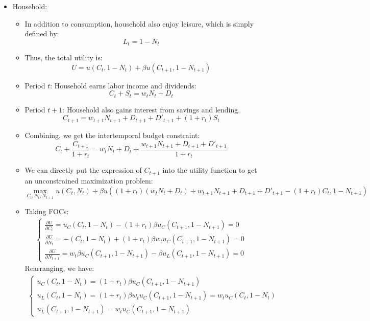 \documentclass[notitlepage]{article}
\begin{document}
\begin{figure}[h]
    \centering
    \resizebox{0.2\textwidth}{!}{}%
    \quad
    \resizebox{0.2\textwidth}{!}{}%
\end{figure}

\begin{itemize}
\item Household:
\begin{itemize}
\item In addition to consumption, household also enjoy leisure, which is simply defined by:
\[
L_t = 1 - N_t
\]
\item Thus, the total utility is:
\[
U = u(C_t, 1-N_t) + \beta u(C_{t+1}, 1-N_{t+1})
\]
\item Period $t$: Household earns labor income and dividends:
\[
C_t + S_t = w_tN_t + D_t
\]
\item Period $t+1$: Household also gains interest from savings and lending.
\[
C_{t+1} = w_{t+1}N_{t+1} + D_{t+1} + D'_{t+1} + (1+r_t)S_t
\]
\item Combining, we get the intertemporal budget constraint:
\[
C_t + \frac{C_{t+1}}{1+r_t} = w_tN_t + D_t + \frac{w_{t+1}N_{t+1} + D_{t+1} + D'_{t+1} 
}{1+r_t}
\]
\item We can directly put the expression of $C_{t+1}$ into the utility function to get an unconstrained maximization problem: 
\[
\max_{C_t, N_t, N_{t+1}} u(C_t, N_t) + \beta u((1+r_t)(w_tN_t + D_t) + w_{t+1}N_{t+1} + D_{t+1} + D'_{t+1}- (1+r_t)C_t, 1-N_{t+1})
\]
\item Taking FOCs:
\begin{align*}
\begin{cases}
\frac{\partial U}{\partial C_t} = u_C(C_t, 1-N_t) - (1+r_t) \beta u_C(C_{t+1}, 1-N_{t+1}) = 0 \\
\frac{\partial U}{\partial N_t} = -(C_t, 1-N_t) +(1+r_t) \beta w_t u_C(C_{t+1}, 1-N_{t+1}) = 0 \\
\frac{\partial U}{\partial N_{t+1}} = w_t\beta u_C(C_{t+1}, 1-N_{t+1}) - \beta u_L(C_{t+1}, 1-N_{t+1}) = 0
\end{cases}
\end{align*}
Rearranging, we have:
\begin{align*}
\begin{cases}
u_C(C_t, 1-N_t) = (1+r_t) \beta u_C(C_{t+1}, 1-N_{t+1})  \\
u_L(C_t, 1-N_t) = (1+r_t) \beta w_t u_C(C_{t+1}, 1-N_{t+1}) = w_t u_C(C_t, 1-N_t)\\
u_L(C_{t+1}, 1-N_{t+1}) = w_t u_C(C_{t+1}, 1-N_{t+1}) 

\end{cases}
\end{align*}
\end{itemize}
\end{itemize}
\end{document}
